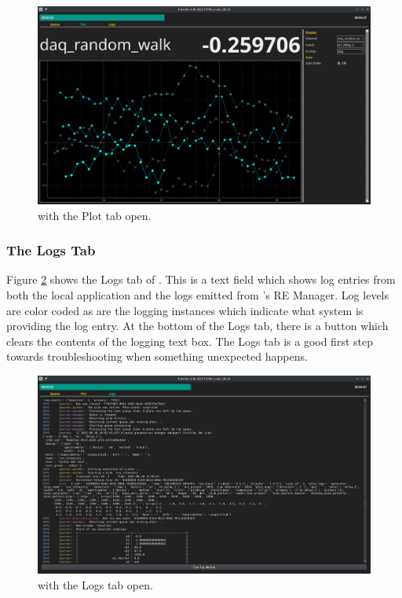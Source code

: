 \begin{landscape}
\begin{figure}
\includegraphics[width=9in]{"acquisition/images/plot_tab"}
\caption[The Plot Tab]{
	\blueskycmds with the Plot tab open.
}
\label{acq:fig:plot_tab}
\end{figure}
\end{landscape}

\subsubsection{The Logs Tab}

Figure \ref{acq:fig:log_tab} shows the Logs tab of \blueskycmds.
This is a text field which shows log entries from both the local application and the logs emitted from \biab's RE Manager.
Log levels are color coded as are the logging instances which indicate what system is providing the log entry.
At the bottom of the Logs tab, there is a button which clears the contents of the logging text box.
The Logs tab is a good first step towards troubleshooting when something unexpected happens.

\begin{landscape}
\begin{figure}
\includegraphics[width=9in]{"acquisition/images/log_tab"}
\caption[The Log Tab]{
	\blueskycmds with the Logs tab open.
}
\label{acq:fig:log_tab}
\end{figure}
\end{landscape}

